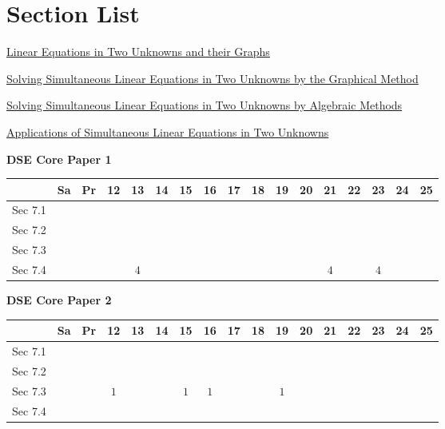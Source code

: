 \documentclass[12pt, a4paper]{article}
\begin{document}
\section*{Section List}
\begin{enumx}[label=Sec 7.\arabic*\ ]
\item \hyperref[section:2-7-1]{Linear Equations in Two Unknowns and their Graphs}
\item \hyperref[section:2-7-2]{Solving Simultaneous Linear Equations in Two Unknowns by the Graphical Method}
\item \hyperref[section:2-7-3]{Solving Simultaneous Linear Equations in Two Unknowns by Algebraic Methods}
\item \hyperref[section:2-7-4]{Applications of Simultaneous Linear Equations in Two Unknowns }
\end{enumx}
\begin{absolutelynopagebreak}
\begin{center}
\textbf{DSE Core Paper 1}
\end{center}
\begin{center}
\begin{tabular}{|l|c|c|c|c|c|c|c|c|c|c|c|c|c|c|c|c|}
\hline
        & Sa & Pr & 12 & 13 & 14 & 15 & 16 & 17 & 18 & 19 & 20 & 21 & 22 & 23 & 24 & 25 \\\hline\hline
Sec 7.1 &  &  &  &  &  &  &  &  &  &  &  &  &  &  &  &  \\\hline
Sec 7.2 &  &  &  &  &  &  &  &  &  &  &  &  &  &  &  &  \\\hline
Sec 7.3 &  &  &  &  &  &  &  &  &  &  &  &  &  &  &  &  \\\hline
Sec 7.4 &  &  &  &  $4$ &  &  &  &  &  &  &  &  $4$ &  &  $4$ &  &  \\\hline
\end{tabular}
\end{center}
\end{absolutelynopagebreak}
\begin{absolutelynopagebreak}
\begin{center}
\textbf{DSE Core Paper 2}
\end{center}
\begin{center}
\begin{tabular}{|l|c|c|c|c|c|c|c|c|c|c|c|c|c|c|c|c|}
\hline
        & Sa & Pr & 12 & 13 & 14 & 15 & 16 & 17 & 18 & 19 & 20 & 21 & 22 & 23 & 24 & 25 \\\hline\hline
Sec 7.1 &  &  &  &  &  &  &  &  &  &  &  &  &  &  &  &  \\\hline
Sec 7.2 &  &  &  &  &  &  &  &  &  &  &  &  &  &  &  &  \\\hline
Sec 7.3 &  &  &  $1$ &  &  &  $1$ &  $1$ &  &  &  $1$ &  &  &  &  &  &  \\\hline
Sec 7.4 &  &  &  &  &  &  &  &  &  &  &  &  &  &  &  &  \\\hline
\end{tabular}
\end{center}
\end{absolutelynopagebreak}
\end{document}

